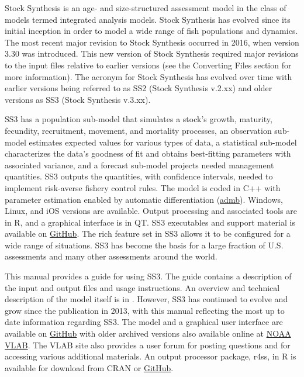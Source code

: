 Stock Synthesis is an age- and size-structured assessment model in the class of models termed integrated analysis models. Stock Synthesis has evolved since its initial inception in order to model a wide range of fish populations and dynamics.  The most recent major revision to Stock Synthesis occurred in 2016, when version 3.30 was introduced. This new version of Stock Synthesis required major revisions to the input files relative to earlier versions (see the \hypertarget{ConvIssues}{Converting Files} section for more information). The acronym for Stock Synthesis has evolved over time with earlier versions being referred to as SS2 (Stock Synthesis v.2.xx) and older versions as SS3 (Stock Synthesis v.3.xx). 

SS3 has a population sub-model that simulates a stock's growth, maturity, fecundity, recruitment, movement, and mortality processes, an observation sub-model estimates expected values for various types of data, a statistical sub-model characterizes the data's goodness of fit and obtains best-fitting parameters with associated variance, and a forecast sub-model projects needed management quantities.  SS3 outputs the quantities, with confidence intervals, needed to implement risk-averse fishery control rules. The model is coded in C++ with parameter estimation enabled by automatic differentiation (\href{http://www.admb-project.org}{admb}). Windows, Linux, and iOS versions are available.  Output processing and associated tools are in R, and a graphical interface is in QT.  SS3 executables and support material is available on \href{https://github.com/nmfs-stock-synthesis}{GitHub}. The rich feature set in SS3 allows it to be configured for a wide range of situations.  SS3 has become the basis for a large fraction of U.S. assessments and many other assessments around the world.  

This manual provides a guide for using SS3. The guide contains a description of the input and output files and usage instructions. An overview and technical description of the model itself is in \citet{methotstock2013}. However, SS3 has continued to evolve and grow since the publication in 2013, with this manual reflecting the most up to date information regarding SS3.  The model and a graphical user interface are available on \href{https://github.com/nmfs-stock-synthesis}{GitHub} with older archived versions also available online at \href{https://vlab.noaa.gov/web/stock-synthesis}{NOAA VLAB}. The VLAB site also provides a user forum for posting questions and for accessing various additional materials. An output processor package, r4ss, in R is available for download from CRAN or \href{https://github.com/r4ss/r4ss}{GitHub}.

